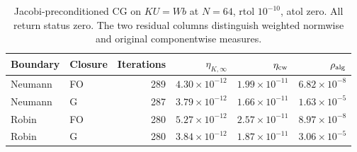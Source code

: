 \begin{table}[H]
\centering
\footnotesize
\setlength{\tabcolsep}{4pt}
\begin{tabular}{llrrrr}
\toprule
Boundary & Closure & Iterations & $\eta_{K,\infty}$ & $\eta_{\rm cw}$ & $\rho_{\rm alg}$ \\
\midrule
Neumann & FO & 289 & $4.30\times10^{-12}$ & $1.99\times10^{-11}$ & $6.82\times10^{-8}$ \\
Neumann & G & 287 & $3.79\times10^{-12}$ & $1.66\times10^{-11}$ & $1.63\times10^{-5}$ \\
Robin & FO & 280 & $5.27\times10^{-12}$ & $2.57\times10^{-11}$ & $8.97\times10^{-8}$ \\
Robin & G & 280 & $3.84\times10^{-12}$ & $1.87\times10^{-11}$ & $3.06\times10^{-5}$ \\
\bottomrule
\end{tabular}
\caption{Jacobi-preconditioned CG on $K U=Wb$ at $N=64$, rtol $10^{-10}$, atol zero. All return status zero. The two residual columns distinguish weighted normwise and original componentwise measures.}
\label{tab:cg-summary}
\end{table}
